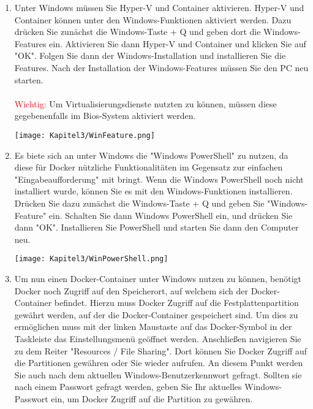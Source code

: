 \begin{enumerate}
    \item Unter Windows müssen Sie Hyper-V und Container aktivieren. Hyper-V und Container können unter den Windows-Funktionen aktiviert werden. Dazu drücken Sie zunächst die Windows-Taste + Q und geben dort die Windows-Features ein. Aktivieren Sie dann Hyper-V und Container und klicken Sie auf "OK". Folgen Sie dann der Windows-Installation und installieren Sie die Features. Nach der Installation der Windows-Features müssen Sie den PC neu starten.\\\\\textcolor{red}{Wichtig:} Um Virtualisierungsdienste nutzten zu können, müssen diese gegebenenfalls im Bios-System aktiviert werden.
    \begin{center}
        \begin{minipage}[t]{0.35\textwidth}
            \centering
            \texttt{[image: Kapitel3/WinFeature.png]}
            \label{ContainerConfig}
        \end{minipage}
    \end{center}

    \item Es biete sich an unter Windows die "Windows PowerShell"{} zu nutzen, da diese für Docker nützliche Funktionalitäten im Gegensatz zur einfachen "Eingabeaufforderung"{} mit bringt. Wenn die Windows PowerShell noch nicht installiert wurde, können Sie es mit den Windows-Funktionen installieren. Drücken Sie dazu zunächst die Windows-Taste + Q und geben Sie "Windows-Feature" ein. Schalten Sie dann Windows PowerShell ein, und drücken Sie dann "OK". Installieren Sie PowerShell und starten Sie dann den Computer neu. 

    \begin{center}
        \begin{minipage}[t]{0.4\textwidth}
            \centering
            \texttt{[image: Kapitel3/WinPowerShell.png]}
            \label{ContainerConfig}
        \end{minipage}
    \end{center}


    \item Um nun einen Docker-Container unter Windows nutzen zu können, benötigt Docker noch Zugriff auf den Speicherort, auf welchem sich der Docker-Container befindet. Hierzu muss Docker Zugriff auf die Festplattenpartition gewährt werden, auf der die Docker-Container gespeichert sind. Um dies zu ermöglichen muss mit der linken Maustaste auf das Docker-Symbol in der Taskleiste das Einstellungsmenü geöffnet werden. Anschließen navigieren Sie zu dem Reiter "Resources / File Sharing"{}. Dort können Sie Docker Zugriff auf die Partitionen gewähren oder Sie wieder aufrufen. An diesem Punkt werden Sie auch nach dem aktuellen Windows-Benutzerkennwort gefragt. Sollten sie nach einem Passwort gefragt werden, geben Sie Ihr aktuelles Windows-Passwort ein, um Docker Zugriff auf die Partition zu gewähren. 
    

\end{enumerate}
